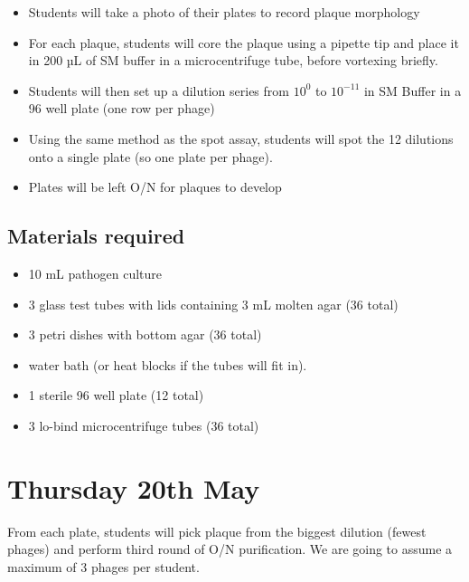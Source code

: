 \documentclass[
]{book}
\providecommand{\tightlist}{%
  \setlength{\itemsep}{0pt}\setlength{\parskip}{0pt}}
\begin{document}
\begin{itemize}
\tightlist
\item
  Students will take a photo of their plates to record plaque morphology
\item
  For each plaque, students will core the plaque using a pipette tip and place it in 200 µL of SM buffer in a microcentrifuge tube, before vortexing briefly.
\item
  Students will then set up a dilution series from \(10^{0}\) to \(10^{-11}\) in SM Buffer in a 96 well plate (one row per phage)
\item
  Using the same method as the spot assay, students will spot the 12 dilutions onto a single plate (so one plate per phage).
\item
  Plates will be left O/N for plaques to develop
\end{itemize}

\hypertarget{materials-required-2}{%
\subsection{Materials required}\label{materials-required-2}}

\begin{itemize}
\tightlist
\item
  10 mL pathogen culture
\item
  3 glass test tubes with lids containing 3 mL molten agar (36 total)
\item
  3 petri dishes with bottom agar (36 total)
\item
  water bath (or heat blocks if the tubes will fit in).
\item
  1 sterile 96 well plate (12 total)
\item
  3 lo-bind microcentrifuge tubes (36 total)
\end{itemize}

\hypertarget{thursday-20th-may}{%
\section{Thursday 20th May}\label{thursday-20th-may}}

From each plate, students will pick plaque from the biggest dilution (fewest phages) and perform third round of O/N purification. We are going to assume a maximum of 3 phages per student.
\end{document}
